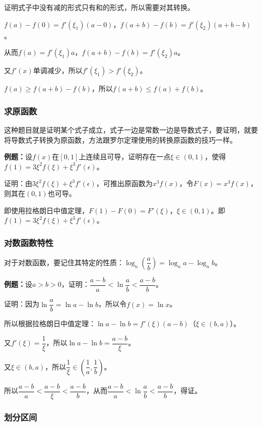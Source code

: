 \documentclass[UTF8, 12pt]{ctexart}
\begin{document}
证明式子中没有减的形式只有和的形式，所以需要对其转换。

$f(a)-f(0)=f'(\xi_1)(a-0)$，$f(a+b)-f(b)=f'(\xi_2)(a+b-b)$。

从而$f(a)=f'(\xi_1)a$，$f(a+b)-f(b)=f'(\xi_2)a$。

又$f'(x)$单调减少，所以$f'(\xi_1)>f'(\xi_2)$。

$f(a)\geqslant f(a+b)-f(b)$，所以$f(a+b)\leqslant f(a)+f(b)$。

\subsubsection{求原函数}

这种题目就是证明某个式子成立，式子一边是常数一边是导数式子，要证明，就要将导数式子转换为原函数，方法跟罗尔定理使用的转换原函数的技巧一样。

\textbf{例题：}设$f(x)$在$[0,1]$上连续且可导，证明存在一点$\xi\in(0,1)$，使得$f(1)=3\xi^2f(\xi)+\xi^3f'(\epsilon)$。

证明：由$3\xi^2f(\xi)+\xi^3f'(\epsilon)$，可推出原函数为$x^3f(x)$，令$F(x)=x^3f(x)$，则其在$(0,1)$也可导。

即使用拉格朗日中值定理，$F(1)-F(0)=F'(\xi)$，$\xi\in(0,1)$。即$f(1)=3\xi^2f(\xi)+\xi^3f'(\epsilon)$。

\subsubsection{对数函数特性}

对于对数函数，要记住其特定的性质：$\log_n(\dfrac{a}{b})=\log_na-\log_nb$。

\textbf{例题：}设$a>b>0$，证明：$\dfrac{a-b}{a}<\ln\dfrac{a}{b}<\dfrac{a-b}{b}$。

证明：因为$\ln\dfrac{a}{b}=\ln a-\ln b$，所以令$f(x)=\ln x$。

所以根据拉格朗日中值定理：$\ln a-\ln b=f'(\xi)(a-b)$（$\xi\in(b,a)$）。

又$f'(\xi)=\dfrac{1}{\xi}$，所以$\ln a-\ln b=\dfrac{a-b}{\xi}$。

又$\xi\in(b,a)$，所以$\dfrac{1}{\xi}\in(\dfrac{1}{a},\dfrac{1}{b})$。

所以$\dfrac{a-b}{a}<\dfrac{a-b}{\xi}<\dfrac{a-b}{b}$，从而$\dfrac{a-b}{a}<\ln\dfrac{a}{b}<\dfrac{a-b}{b}$，得证。

\subsubsection{划分区间}
\end{document}
